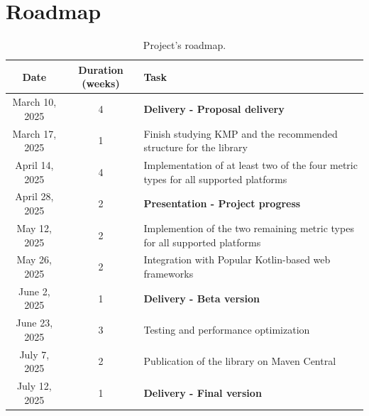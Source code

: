 \documentclass[a4paper,twoside,11pt]{article}
\begin{document}
\section{Roadmap}
\begin{table}[h!]
\centering
\renewcommand{\arraystretch}{1.3}
\begin{tabular}{ |c|c|m{10cm}|  }
  \hline
  \textbf{Date} &\textbf{Duration (weeks)} &\textbf{Task}\\
  \hline
  March 10, 2025   & 4 & \textbf{Delivery - Proposal delivery}\\
  \hline
  March 17, 2025  & 1 & Finish studying KMP and the recommended structure for the library \\
  \hline
  April 14, 2025  & 4 &Implementation of at least two of the four metric types for all supported platforms\\
  \hline
  April 28, 2025 & 2 &   \textbf{Presentation - Project progress}\\
  \hline
  May 12, 2025 & 2 &   Implemention of the two remaining metric types for all supported platforms\\
  \hline
  May 26, 2025 & 2 &   Integration with Popular Kotlin-based web frameworks\\
  \hline
  June 2, 2025 & 1 &\textbf{Delivery - Beta version}\\
  \hline
  June 23, 2025 & 3 &Testing and performance optimization\\
  \hline
  July 7, 2025 & 2 &Publication of the library on Maven Central\\
  \hline
  July 12, 2025    & 1 &\textbf{Delivery - Final version}\\
  \hline
 \end{tabular}
 \caption{Project's roadmap.}
 \label{table:2}
\end{table}
\FloatBarrier



\end{document}
